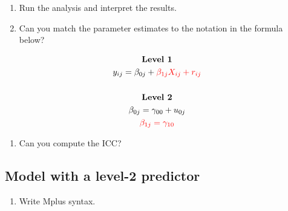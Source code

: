 \documentclass[
]{book}
\providecommand{\tightlist}{%
  \setlength{\itemsep}{0pt}\setlength{\parskip}{0pt}}
\begin{document}
\begin{enumerate}
\def\labelenumi{\arabic{enumi}.}
\setcounter{enumi}{1}
\item
  Run the analysis and interpret the results.
\item
  Can you match the parameter estimates to the notation in the formula below?
\end{enumerate}

\[
\begin{gathered}
\textbf{Level 1} \\
y_{ij}=\beta_{0j} + \color{red}{\beta_{1j}X_{ij}} + r_{ij} \\ \\
\textbf{Level 2} \\
\beta_{0j}=\gamma_{00} + u_{0j} \\
\color{red}{\beta_{1j}=\gamma_{10}}
\end{gathered}
\]

\begin{enumerate}
\def\labelenumi{\arabic{enumi}.}
\setcounter{enumi}{3}
\tightlist
\item
  Can you compute the ICC?
\end{enumerate}

\hypertarget{model-with-a-level-2-predictor}{%
\subsection{Model with a level-2 predictor}\label{model-with-a-level-2-predictor}}

\begin{enumerate}
\def\labelenumi{\arabic{enumi}.}
\tightlist
\item
  Write Mplus syntax.
\end{enumerate}
\end{document}
